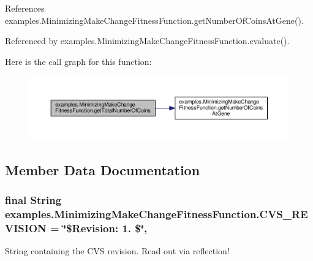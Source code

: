 References examples.\-Minimizing\-Make\-Change\-Fitness\-Function.\-get\-Number\-Of\-Coins\-At\-Gene().



Referenced by examples.\-Minimizing\-Make\-Change\-Fitness\-Function.\-evaluate().



Here is the call graph for this function\-:
\nopagebreak
\begin{figure}[H]
\begin{center}
\leavevmode
\includegraphics[width=350pt]{classexamples_1_1_minimizing_make_change_fitness_function_a55b53d2df29ad9237ca717450dba5af8_cgraph}
\end{center}
\end{figure}




\subsection{Member Data Documentation}
\hypertarget{classexamples_1_1_minimizing_make_change_fitness_function_afb9d4b41d5ad6212e7b98cc9d0aaaa73}{
\subsubsection[{C\-V\-S\-\_\-\-R\-E\-V\-I\-S\-I\-O\-N}]{\setlength{\rightskip}{0pt plus 5cm}final String examples.\-Minimizing\-Make\-Change\-Fitness\-Function.\-C\-V\-S\-\_\-\-R\-E\-V\-I\-S\-I\-O\-N = \char`\"{}\$Revision\-: 1. \$\char`\"{}\hspace{0.3cm}{\ttfamily [static]}, {\ttfamily [private]}}}\label{classexamples_1_1_minimizing_make_change_fitness_function_afb9d4b41d5ad6212e7b98cc9d0aaaa73}
String containing the C\-V\-S revision. Read out via reflection! 

